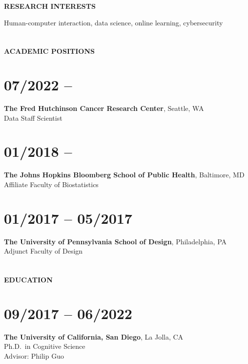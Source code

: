 \textbf{RESEARCH INTERESTS}
\vspace{0.05in}

Human-computer interaction, data science, online learning, cybersecurity

\section{} \vspace{0.125in} \textbf{ACADEMIC POSITIONS} \vspace{-0.5em}

\section{07/2022 --}
\textbf{The Fred Hutchinson Cancer Research Center}, Seattle, WA \\
Data Staff Scientist

\section{01/2018 --}
\textbf{The Johns Hopkins Bloomberg School of Public Health}, Baltimore, MD \\
Affiliate Faculty of Biostatistics

\section{01/2017 -- 05/2017}
\textbf{The University of Pennsylvania School of Design}, Philadelphia, PA \\
Adjunct Faculty of Design

\section{} \vspace{0.1in} \textbf{EDUCATION} \vspace{-0.5em}

\section{09/2017 -- 06/2022}

\textbf{The University of California, San Diego}, La Jolla, CA \\
Ph.D.\ in Cognitive Science \\
Advisor: Philip Guo %

